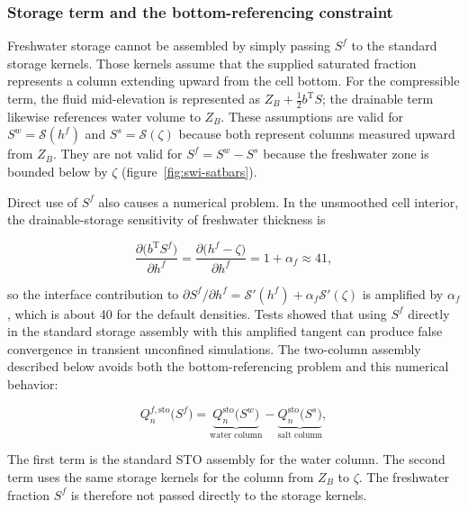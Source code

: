 \subsubsection{Storage term and the bottom-referencing constraint}
\label{sec:swi-storage}

Freshwater storage cannot be assembled by simply passing $S^{f}$ to the standard \mf storage kernels. Those kernels assume that the supplied saturated fraction represents a column extending upward from the cell bottom. For the compressible term, the fluid mid-elevation is represented as $Z_{B}+\tfrac12 b^{\mathrm{T}}S$; the drainable term likewise references water volume to $Z_{B}$. These assumptions are valid for $S^{w}=\mathcal{S}(h^{f})$ and $S^{s}=\mathcal{S}(\zeta)$ because both represent columns measured upward from $Z_{B}$. They are not valid for $S^{f}=S^{w}-S^{s}$ because the freshwater zone is bounded below by $\zeta$ (figure~\ref{fig:swi-satbars}).

Direct use of $S^{f}$ also causes a numerical problem. In the unsmoothed cell interior, the drainable-storage sensitivity of freshwater thickness is

\begin{equation}
\label{eqn:swi-zonederiv}
\frac{\partial\big(b^{\mathrm{T}}S^{f}\big)}{\partial h^{f}}
=\frac{\partial\big(h^{f}-\zeta\big)}{\partial h^{f}}
=1+\alpha_{f}\approx 41,
\end{equation}

\noindent so the interface contribution to $\partial S^{f}/\partial h^{f}=\mathcal{S}'(h^{f})+\alpha_{f}\mathcal{S}'(\zeta)$ is amplified by $\alpha_{f}$, which is about 40 for the default densities. Tests showed that using $S^{f}$ directly in the standard storage assembly with this amplified tangent can produce false convergence in transient unconfined simulations. The two-column assembly described below avoids both the bottom-referencing problem and this numerical behavior:

\begin{equation}
\label{eqn:swi-twocol}
Q_{n}^{f,\mathrm{sto}}\big(S^{f}\big)
=\underbrace{Q_{n}^{\mathrm{sto}}\big(S^{w}\big)}_{\text{water column}}
-\underbrace{Q_{n}^{\mathrm{sto}}\big(S^{s}\big)}_{\text{salt column}},
\end{equation}

\noindent The first term is the standard STO assembly for the water column. The second term uses the same storage kernels for the column from $Z_{B}$ to $\zeta$. The freshwater fraction $S^{f}$ is therefore not passed directly to the storage kernels.

